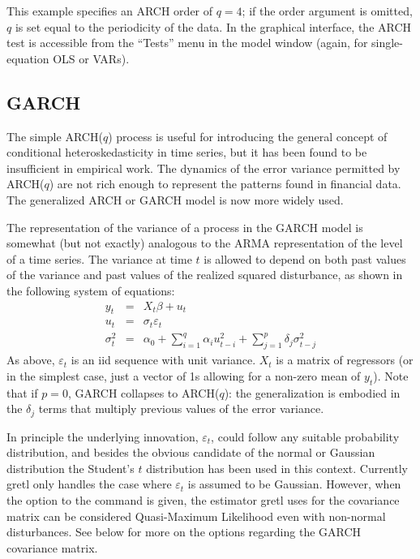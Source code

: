 This example specifies an ARCH order of $q=4$; if the order argument
is omitted, $q$ is set equal to the periodicity of the data.  In the
graphical interface, the ARCH test is accessible from the ``Tests''
menu in the model window (again, for single-equation OLS or VARs).

\subsection{GARCH}
\label{subsec:garch}

The simple ARCH($q$) process is useful for introducing the general
concept of conditional heteroskedasticity in time series, but it has
been found to be insufficient in empirical work.  The dynamics of the
error variance permitted by ARCH($q$) are not rich enough to represent 
the patterns found in financial data.  The generalized ARCH or GARCH
model is now more widely used.  

The representation of the variance of a process in the GARCH model is
somewhat (but not exactly) analogous to the ARMA representation of the
level of a time series.  The variance at time $t$ is allowed
to depend on both past values of the variance and past values of the
realized squared disturbance, as shown in the following system
of equations:
\begin{eqnarray}
  \label{eq:garch-meaneq}
  y_t &  = & X_t \beta + u_t \\
  \label{eq:garch-epseq}
  u_t &  = & \sigma_t \varepsilon_t \\
  \label{eq:garch-vareq}
  \sigma^2_t & = & \alpha_0 + \sum_{i=1}^q \alpha_i u^2_{t-i} +
	  \sum_{j=1}^p \delta_j \sigma^2_{t-j}
\end{eqnarray}
As above, $\varepsilon_t$ is an iid sequence with unit variance.
$X_t$ is a matrix of regressors (or in the simplest case,
just a vector of 1s allowing for a non-zero mean of $y_t$).  Note that
if $p=0$, GARCH collapses to ARCH($q$): the generalization is embodied
in the $\delta_j$ terms that multiply previous values of the error
variance.

In principle the underlying innovation, $\varepsilon_t$, could follow
any suitable probability distribution, and besides the obvious
candidate of the normal or Gaussian distribution the Student's $t$
distribution has been used in this context.  Currently gretl
only handles the case where $\varepsilon_t$ is assumed to be Gaussian.
However, when the  option to the  command is
given, the estimator gretl uses for the covariance matrix can be
considered Quasi-Maximum Likelihood even with non-normal disturbances.
See below for more on the options regarding the GARCH covariance
matrix.

